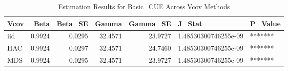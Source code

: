 \begin{table}[ht]
\centering
\begin{tabular}{lrrrrll}
  \hline
Vcov & Beta & Beta\_SE & Gamma & Gamma\_SE & J\_Stat & P\_Value \\ 
  \hline
iid & 0.9924 & 0.0295 & 32.4571 & 23.9727 & 1.48530300746255e-09 & ******* \\ 
  HAC & 0.9924 & 0.0297 & 32.4571 & 24.7460 & 1.48530300746255e-09 & ******* \\ 
  MDS & 0.9924 & 0.0295 & 32.4571 & 23.9727 & 1.48530300746255e-09 & ******* \\ 
   \hline
\end{tabular}
\caption{Estimation Results for Basic_CUE Across Vcov Methods} 
\label{tab:basiccue}
\end{table}
